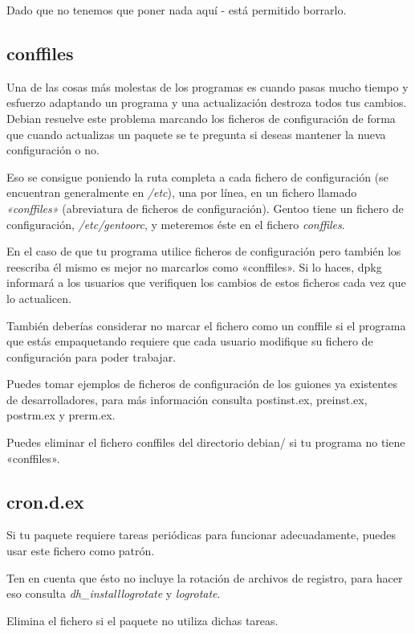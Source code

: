 \documentclass[letterpaper,12pt,spanish]{manual}
\begin{document}
Dado que no tenemos que poner nada aquí - está permitido borrarlo.


\subsection{conffiles}

Una de las cosas más molestas de los programas es cuando pasas mucho tiempo y esfuerzo adaptando un programa y una actualización destroza todos tus cambios. Debian resuelve este problema marcando los ficheros de configuración de forma que cuando actualizas un paquete se te pregunta si deseas mantener la nueva configuración o no.

Eso se consigue poniendo la ruta completa a cada fichero de configuración (se encuentran generalmente en \emph{/etc}), una por línea, en un fichero llamado \emph{«conffiles»} (abreviatura de ficheros de configuración). Gentoo tiene un fichero de configuración, \emph{/etc/gentoorc}, y meteremos éste en el fichero \emph{conffiles}.

En el caso de que tu programa utilice ficheros de configuración pero también los reescriba él mismo es mejor no marcarlos como «conffiles». Si lo haces, dpkg informará a los usuarios que verifiquen los cambios de estos ficheros cada vez que lo actualicen.

También deberías considerar no marcar el fichero como un conffile si el programa que estás empaquetando requiere que cada usuario modifique su fichero de configuración para poder trabajar.

Puedes tomar ejemplos de ficheros de configuración de los guiones ya existentes de desarrolladores, para más información consulta postinst.ex, preinst.ex, postrm.ex y prerm.ex.

Puedes eliminar el fichero conffiles del directorio debian/ si tu programa no tiene «conffiles».


\subsection{cron.d.ex}

Si tu paquete requiere tareas periódicas para funcionar adecuadamente, puedes usar este fichero como patrón.

Ten en cuenta que ésto no incluye la rotación de archivos de registro, para hacer eso consulta \emph{dh\_installlogrotate} y \emph{logrotate}.

Elimina el fichero si el paquete no utiliza dichas tareas.
\end{document}
